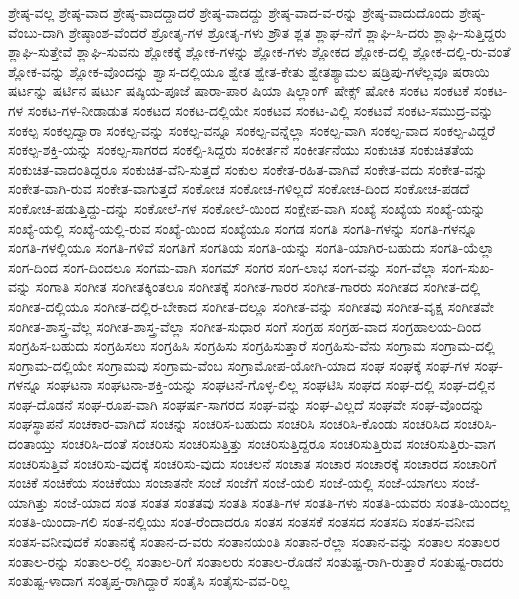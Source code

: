 {ಶ್ರೇಷ್ಠ-ವಲ್ಲ
ಶ್ರೇಷ್ಠ-ವಾದ
ಶ್ರೇಷ್ಠ-ವಾದದ್ದಾದರೆ
ಶ್ರೇಷ್ಠ-ವಾದದ್ದು
ಶ್ರೇಷ್ಠ-ವಾದ-ವ-ರನ್ನು
ಶ್ರೇಷ್ಠ-ವಾದುದೊಂದು
ಶ್ರೇಷ್ಠ-ವೆಂಬು-ದಾಗಿ
ಶ್ರೇಷ್ಠಾಂಶ-ವೆಂದರೆ
ಶ್ರೋತೃ-ಗಳ
ಶ್ರೋತೃ-ಗಳು
ಶ್ರೌತ
ಶ್ಲತ
ಶ್ಲಾಘ-ನೆಗೆ
ಶ್ಲಾಘಿ-ಸಿ-ದರು
ಶ್ಲಾಘಿ-ಸುತ್ತಿದ್ದರು
ಶ್ಲಾಘಿ-ಸುತ್ತೇವೆ
ಶ್ಲಾಘಿ-ಸುವನು
ಶ್ಲೋಕಕ್ಕೆ
ಶ್ಲೋಕ-ಗಳನ್ನು
ಶ್ಲೋಕ-ಗಳು
ಶ್ಲೋಕದ
ಶ್ಲೋಕ-ದಲ್ಲಿ
ಶ್ಲೋಕ-ದಲ್ಲಿ-ರು-ವಂತೆ
ಶ್ಲೋಕ-ವನ್ನು
ಶ್ಲೋಕ-ವೊಂದನ್ನು
ಶ್ವಾಸ-ದಲ್ಲಿಯೂ
ಶ್ವೇತ
ಶ್ವೇತ-ಕೇತು
ಶ್ವೇತಶ್ಯಾಮಲ
ಷಡ್ರಿಪು-ಗಳೆಲ್ಲವೂ
ಷರಾಯಿ
ಷರ್ಟನ್ನು
ಷರ್ಟಿನ
ಷರ್ಟು
ಷಷ್ಠಿಯ-ಪೂಜೆ
ಷಾರಾ-ಪಾರ
ಷಿಯಾ
ಷಿಲ್ಲಾಂಗ್
ಷೇಕ್ಸ್
ಷೋಕಿ
ಸಂಕಟ
ಸಂಕಟಕೆ
ಸಂಕಟ-ಗಳ
ಸಂಕಟ-ಗಳ-ನೀಡಾಡುತ
ಸಂಕಟದ
ಸಂಕಟ-ದಲ್ಲಿಯೇ
ಸಂಕಟವ
ಸಂಕಟ-ವಿಲ್ಲಿ
ಸಂಕಟವೆ
ಸಂಕಟ-ಸಮುದ್ರ-ವನ್ನು
ಸಂಕಲ್ಪ
ಸಂಕಲ್ಪದ್ವಾರಾ
ಸಂಕಲ್ಪ-ವನ್ನು
ಸಂಕಲ್ಪ-ವನ್ನೂ
ಸಂಕಲ್ಪ-ವನ್ನೆಲ್ಲಾ
ಸಂಕಲ್ಪ-ವಾಗಿ
ಸಂಕಲ್ಪ-ವಾದ
ಸಂಕಲ್ಪ-ವಿದ್ದರೆ
ಸಂಕಲ್ಪ-ಶಕ್ತಿ-ಯನ್ನು
ಸಂಕಲ್ಪ-ಸಾಗರದ
ಸಂಕಲ್ಪಿ-ಸಿದ್ದರು
ಸಂಕೀರ್ತನೆ
ಸಂಕೀರ್ತನೆಯು
ಸಂಕುಚಿತ
ಸಂಕುಚಿತತೆಯ
ಸಂಕುಚಿತ-ವಾದಂತಿದ್ದರೂ
ಸಂಕುಚಿತ-ವೆನಿ-ಸುತ್ತದೆ
ಸಂಕುಲ
ಸಂಕೇತ-ರಹಿತ-ವಾಗಿವೆ
ಸಂಕೇತ-ವದು
ಸಂಕೇತ-ವನ್ನು
ಸಂಕೇತ-ವಾಗಿ-ರುವ
ಸಂಕೇತ-ವಾಗುತ್ತದೆ
ಸಂಕೋಚ
ಸಂಕೋಚ-ಗಳಿಲ್ಲದೆ
ಸಂಕೋಚ-ದಿಂದ
ಸಂಕೋಚ-ಪಡದೆ
ಸಂಕೋಚ-ಪಡುತ್ತಿದ್ದು-ದನ್ನು
ಸಂಕೋಲೆ-ಗಳ
ಸಂಕೋಲೆ-ಯಿಂದ
ಸಂಕ್ಷೇಪ-ವಾಗಿ
ಸಂಖ್ಯೆ
ಸಂಖ್ಯೆಯ
ಸಂಖ್ಯೆ-ಯನ್ನು
ಸಂಖ್ಯೆ-ಯಲ್ಲಿ
ಸಂಖ್ಯೆ-ಯಲ್ಲಿ-ರುವ
ಸಂಖ್ಯೆ-ಯಿಂದ
ಸಂಖ್ಯೆಯೂ
ಸಂಗಡ
ಸಂಗತಿ
ಸಂಗತಿ-ಗಳನ್ನು
ಸಂಗತಿ-ಗಳನ್ನೂ
ಸಂಗತಿ-ಗಳಲ್ಲಿಯೂ
ಸಂಗತಿ-ಗಳಿವೆ
ಸಂಗತಿಗೆ
ಸಂಗತಿಯ
ಸಂಗತಿ-ಯನ್ನು
ಸಂಗತಿ-ಯಾಗಿರ-ಬಹುದು
ಸಂಗತಿ-ಯೆಲ್ಲಾ
ಸಂಗ-ದಿಂದ
ಸಂಗ-ದಿಂದಲೂ
ಸಂಗಮ-ವಾಗಿ
ಸಂಗಮ್
ಸಂಗರ
ಸಂಗ-ಲಾಭ
ಸಂಗ-ವನ್ನು
ಸಂಗ-ವೆಲ್ಲಾ
ಸಂಗ-ಸುಖ-ವನ್ನು
ಸಂಗಾತಿ
ಸಂಗೀತ
ಸಂಗೀತಕ್ಕಿಂತಲೂ
ಸಂಗೀತಕ್ಕೆ
ಸಂಗೀತ-ಗಾರರ
ಸಂಗೀತ-ಗಾರರು
ಸಂಗೀತದ
ಸಂಗೀತ-ದಲ್ಲಿ
ಸಂಗೀತ-ದಲ್ಲಿಯೂ
ಸಂಗೀತ-ದಲ್ಲಿರ-ಬೇಕಾದ
ಸಂಗೀತ-ದಲ್ಲೂ
ಸಂಗೀತ-ವನ್ನು
ಸಂಗೀತವು
ಸಂಗೀತ-ವೃಕ್ಷ
ಸಂಗೀತವೇ
ಸಂಗೀತ-ಶಾಸ್ತ್ರ-ವೆಲ್ಲ
ಸಂಗೀತ-ಶಾಸ್ತ್ರ-ವೆಲ್ಲಾ
ಸಂಗೀತ-ಸುಧಾರ
ಸಂಗೆ
ಸಂಗ್ರಹ
ಸಂಗ್ರಹ-ವಾದ
ಸಂಗ್ರಹಾಲಯ-ದಿಂದ
ಸಂಗ್ರಹಿಸ-ಬಹುದು
ಸಂಗ್ರಹಿಸಲು
ಸಂಗ್ರಹಿಸಿ
ಸಂಗ್ರಹಿಸು
ಸಂಗ್ರಹಿಸುತ್ತಾರೆ
ಸಂಗ್ರಹಿಸು-ವೆನು
ಸಂಗ್ರಾಮ
ಸಂಗ್ರಾಮ-ದಲ್ಲಿ
ಸಂಗ್ರಾಮ-ದಲ್ಲಿಯೇ
ಸಂಗ್ರಾಮವು
ಸಂಗ್ರಾಮ-ವೆಂಬ
ಸಂಗ್ರಾಮೋಪ-ಯೋಗಿ-ಯಾದ
ಸಂಘ
ಸಂಘಕ್ಕೆ
ಸಂಘ-ಗಳ
ಸಂಘ-ಗಳನ್ನೂ
ಸಂಘಟನಾ
ಸಂಘಟನಾ-ಶಕ್ತಿ-ಯನ್ನು
ಸಂಘಟನೆ-ಗೊಳ್ಳ-ಲಿಲ್ಲ
ಸಂಘಟಿಸಿ
ಸಂಘದ
ಸಂಘ-ದಲ್ಲಿ
ಸಂಘ-ದಲ್ಲಿನ
ಸಂಘ-ದೊಡನೆ
ಸಂಘ-ರೂಪ-ವಾಗಿ
ಸಂಘರ್ಷ-ಸಾಗರದ
ಸಂಘ-ವನ್ನು
ಸಂಘ-ವಿಲ್ಲದೆ
ಸಂಘವೇ
ಸಂಘ-ವೊಂದನ್ನು
ಸಂಘಸ್ಥಾಪನೆ
ಸಂಚಕಾರ-ವಾಗಿದೆ
ಸಂಚನ್ನು
ಸಂಚರಿಸ-ಬಹುದು
ಸಂಚರಿಸಿ
ಸಂಚರಿಸಿ-ಕೊಂಡು
ಸಂಚರಿಸಿದ
ಸಂಚರಿಸಿ-ದಂತಾಯ್ತು
ಸಂಚರಿಸಿ-ದಂತೆ
ಸಂಚರಿಸು
ಸಂಚರಿಸುತ್ತಿತ್ತು
ಸಂಚರಿಸುತ್ತಿದ್ದರೂ
ಸಂಚರಿಸುತ್ತಿರುವ
ಸಂಚರಿಸುತ್ತಿರು-ವಾಗ
ಸಂಚರಿಸುತ್ತಿವೆ
ಸಂಚರಿಸು-ವುದಕ್ಕೆ
ಸಂಚರಿಸು-ವುದು
ಸಂಚಲನೆ
ಸಂಚಾತ
ಸಂಚಾರ
ಸಂಚಾರಕ್ಕೆ
ಸಂಚಾರದ
ಸಂಚಾರಿಗೆ
ಸಂಚಿಕೆ
ಸಂಚಿಕೆಯ
ಸಂಚಿಕೆಯು
ಸಂಜಾತನೇ
ಸಂಜೆ
ಸಂಜೆಗೆ
ಸಂಜೆ-ಯಲಿ
ಸಂಜೆ-ಯಲ್ಲಿ
ಸಂಜೆ-ಯಾಗಲು
ಸಂಜೆ-ಯಾಗಿತ್ತು
ಸಂಜೆ-ಯಾದ
ಸಂತ
ಸಂತತ
ಸಂತತವು
ಸಂತತಿ
ಸಂತತಿ-ಗಳ
ಸಂತತಿ-ಗಳು
ಸಂತತಿ-ಯವರು
ಸಂತತಿ-ಯಿಂದಲ್ಲ
ಸಂತತಿ-ಯಿಂದಾ-ಗಲಿ
ಸಂತ-ನಲ್ಲಿಯು
ಸಂತ-ರೆಂದಾದರೂ
ಸಂತಸ
ಸಂತಸಕೆ
ಸಂತಸದ
ಸಂತಸದಿ
ಸಂತಸ-ವನೀವ
ಸಂತಸ-ವನೀವುದಕೆ
ಸಂತಾನಕ್ಕೆ
ಸಂತಾನ-ದ-ವರು
ಸಂತಾನಯಂತಿ
ಸಂತಾನ-ರೆಲ್ಲಾ
ಸಂತಾನ-ವನ್ನು
ಸಂತಾಲ
ಸಂತಾಲರ
ಸಂತಾಲ-ರನ್ನು
ಸಂತಾಲ-ರಲ್ಲಿ
ಸಂತಾಲ-ರಿಗೆ
ಸಂತಾಲರು
ಸಂತಾಲ-ರೊಡನೆ
ಸಂತುಷ್ಟ-ರಾಗಿ-ರುತ್ತಾರೆ
ಸಂತುಷ್ಟ-ರಾದರು
ಸಂತುಷ್ಟ-ಳಾದಾಗ
ಸಂತೃಪ್ತ-ರಾಗಿದ್ದಾರೆ
ಸಂತೈಸಿ
ಸಂತೈಸು-ವವ-ರಿಲ್ಲ
}
